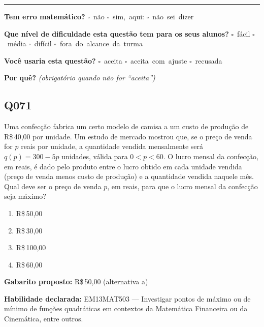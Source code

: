 \documentclass[11pt,a4paper]{article}
\begin{document}
\noindent\rule{\linewidth}{0.4pt}
\textbf{Tem erro matemático?}\quad
\mbox{$\square$~não} \quad \mbox{$\square$~sim, aqui:} \underline{\hspace{5cm}}
\quad \mbox{$\square$~não sei dizer}

\textbf{Que nível de dificuldade esta questão tem para os seus alunos?}\quad
\mbox{$\square$~fácil} \quad \mbox{$\square$~média} \quad
\mbox{$\square$~difícil} \quad \mbox{$\square$~fora do alcance da turma}

\textbf{Você usaria esta questão?}\quad
\mbox{$\square$~aceita} \quad \mbox{$\square$~aceita com ajuste} \quad
\mbox{$\square$~recusada}

\textbf{Por quê?} \emph{(obrigatório quando não for ``aceita'')}

\underline{\hspace{\linewidth}}

\underline{\hspace{\linewidth}}
\vspace{0.6em}

\begin{samepage}
\subsection*{Q071}
Uma confecção fabrica um certo modelo de camisa a um custo de produção de R\$\,40,00 por unidade. Um estudo de mercado mostrou que, se o preço de venda for $p$ reais por unidade, a quantidade vendida mensalmente será $q(p) = 300 - 5p$ unidades, válida para $0 < p < 60$. O lucro mensal da confecção, em reais, é dado pelo produto entre o lucro obtido em cada unidade vendida (preço de venda menos custo de produção) e a quantidade vendida naquele mês. Qual deve ser o preço de venda $p$, em reais, para que o lucro mensal da confecção seja máximo?
\begin{enumerate}[label=(\alph*),nosep,leftmargin=*]
\item R\$\,50,00
\item R\$\,30,00
\item R\$\,100,00
\item R\$\,60,00
\end{enumerate}

\textbf{Gabarito proposto:} R\$\,50,00 (alternativa a)

\textbf{Habilidade declarada:} EM13MAT503 --- Investigar pontos de máximo ou de mínimo de funções quadráticas em contextos da Matemática Financeira ou da Cinemática, entre outros.
\end{samepage}
\end{document}
